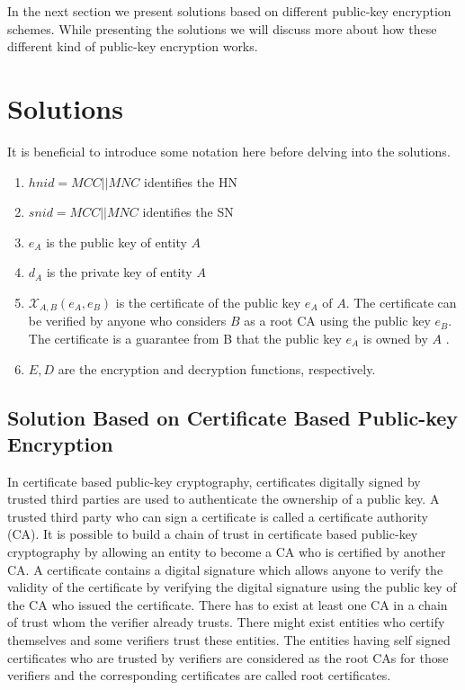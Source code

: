 \documentclass[12pt]{llncs}
\begin{document}
In the next section we present solutions based on different public-key encryption schemes. While presenting the solutions we will discuss more about how these different kind of public-key encryption works.

\section{Solutions}\label{sec:solutions} 
\label{sec:solutions}
It is beneficial to introduce some notation here before delving into the solutions. 
\begin{enumerate}
\item $hnid=MCC||MNC$ identifies the HN
\item $snid=MCC||MNC$ identifies the SN
\item $e_A$ is the public key of entity $A$
\item $d_A$ is the private key of entity $A$ 
\item $\mathcal{X}_{A,B}(e_A,e_B)$ is the certificate of the public key $e_A$ of $A$. The certificate can be verified by anyone who considers $B$ as a root CA using the public key $e_B$. The certificate is a guarantee from B that the public key $e_A$ is owned by $A$ .
\item $E,D$ are the encryption and decryption functions, respectively.
\end{enumerate}


\subsection{Solution Based on Certificate Based Public-key Encryption} 
\label{sub_sec:solution_certificate}
In certificate based public-key cryptography, certificates digitally signed by trusted third parties are used to authenticate the ownership of a public key. A trusted third party who can sign a certificate is called a certificate authority (CA). It is possible to build a chain of trust in certificate based public-key cryptography by allowing an entity to become a CA who is certified by another CA. A certificate contains a digital signature which allows anyone to verify the validity of the certificate by verifying the digital signature using the public key of the CA who issued the certificate. There has to exist at least one CA in a chain of trust whom the verifier already trusts. There might exist entities who certify themselves and some verifiers trust these entities. The entities having self signed certificates who are trusted by verifiers are considered as the root CAs for those verifiers and the corresponding certificates are called root certificates. 
\end{document}

